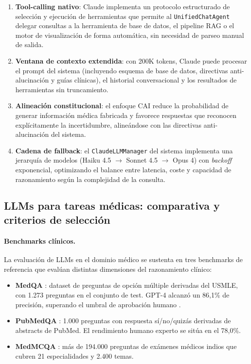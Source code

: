 \begin{enumerate}[nosep, leftmargin=*]
  \item \textbf{Tool-calling nativo}: Claude implementa un protocolo estructurado de selección y ejecución de herramientas que permite al \texttt{Unified\-Chat\-Agent} delegar consultas a la herramienta de base de datos, el pipeline \ac{RAG} o el motor de visualización de forma automática, sin necesidad de parseo manual de salida.
  \item \textbf{Ventana de contexto extendida}: con 200K tokens, Claude puede procesar el prompt del sistema (incluyendo esquema de base de datos, directivas anti-alucinación y guías clínicas), el historial conversacional y los resultados de herramientas sin truncamiento.
  \item \textbf{Alineación constitucional}: el enfoque \ac{CAI} reduce la probabilidad de generar información médica fabricada y favorece respuestas que reconocen explícitamente la incertidumbre, alineándose con las directivas anti-alucinación del sistema.
  \item \textbf{Cadena de fallback}: el \texttt{ClaudeLLMManager} del sistema implementa una jerarquía de modelos (Haiku 4.5 $\rightarrow$ Sonnet 4.5 $\rightarrow$ Opus 4) con \textit{backoff} exponencial, optimizando el balance entre latencia, coste y capacidad de razonamiento según la complejidad de la consulta.
\end{enumerate}

\subsection{\acs{LLM}s para tareas médicas: comparativa y criterios de selección}
\label{subsec:llms-medical}

\paragraph{Benchmarks clínicos.}

La evaluación de \ac{LLM}s en el dominio médico se sustenta en tres benchmarks de referencia que evalúan distintas dimensiones del razonamiento clínico:

\begin{itemize}[nosep, leftmargin=*]
  \item \textbf{MedQA} \parencite{jin2021medqa}: dataset de preguntas de opción múltiple derivadas del \ac{USMLE}, con 1.273 preguntas en el conjunto de test. \acs{GPT}-4 alcanzó un 86,1\% de precisión, superando el umbral de aprobación humano \parencite{nori2023capabilities}.
  \item \textbf{PubMedQA} \parencite{jin2019pubmedqa}: 1.000 preguntas con respuesta sí/no/quizás derivadas de abstracts de PubMed. El rendimiento humano experto se sitúa en el 78,0\%.
  \item \textbf{MedMCQA} \parencite{pal2022medmcqa}: más de 194.000 preguntas de exámenes médicos indios que cubren 21 especialidades y 2.400 temas.
\end{itemize}

